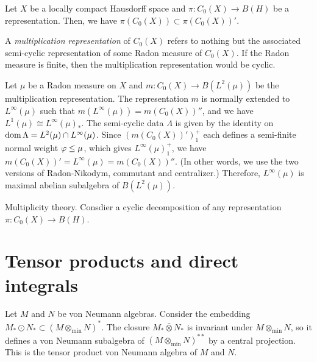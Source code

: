 \documentclass{../../large}
\begin{document}
\begin{prb}
Let $X$ be a locally compact Hausdorff space and $\pi:C_0(X)\to B(H)$ be a representation.
Then, we have $\pi(C_0(X))\subset\pi(C_0(X))'$.

A \emph{multiplication representation} of $C_0(X)$ refers to nothing but the associated semi-cyclic representation of some Radon measure of $C_0(X)$.
If the Radon measure is finite, then the multiplication representation would be cyclic.
\end{prb}
\begin{pf}
Let $\mu$ be a Radon measure on $X$ and $m:C_0(X)\to B(L^2(\mu))$ be the multiplication representation.
The representation $m$ is normally extended to $L^\infty(\mu)$ such that $m(L^\infty(\mu))=m(C_0(X))''$, and we have $L^1(\mu)\cong L^\infty(\mu)_*$.
The semi-cyclic data $\Lambda$ is given by the identity on $\operatorname{dom}\Lambda=L^2(\mu)\cap L^\infty(\mu)$.
Since $(m(C_0(X))')_1^+$ each defines a semi-finite normal weight $\varphi\le\mu$, which gives $L^\infty(\mu)_1^+$, we have $m(C_0(X))'=L^\infty(\mu)=m(C_0(X))''$. (In other words, we use the two versions of Radon-Nikodym, commutant and centralizer.)
Therefore, $L^\infty(\mu)$ is maximal abelian subalgebra of $B(L^2(\mu))$.
\end{pf}

\begin{prb}
Multiplicity theory.
Consdier a cyclic decomposition of any representation $\pi:C_0(X)\to B(H)$.

\end{prb}



\section{Tensor products and direct integrals}


\begin{prb}
Let $M$ and $N$ be von Neumann algebras.
Consider the embedding $M_*\odot N_*\subset(M\otimes_{\min}N)^*$.
The closure $M_*\bar\otimes N_*$ is invariant under $M\otimes_{\min}N$, so it defines a von Neumann subalgebra of $(M\otimes_{\min}N)^{**}$ by a central projection.
This is the tensor product von Neumann algebra of $M$ and $N$.
\end{prb}
\end{document}
